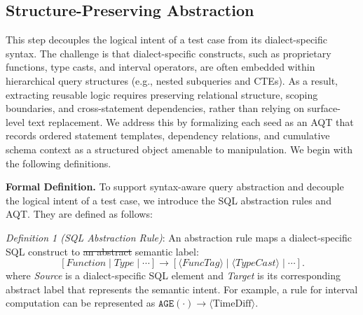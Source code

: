 \documentclass[conference]{IEEEtran}
\makeatletter
\providecommand{\DIFaddtex}[1]{{\protect\color{blue}\uwave{#1}}} %
\providecommand{\DIFdeltex}[1]{{\protect\color{red}\sout{#1}}} %
\providecommand{\DIFaddbegin}{} %
\providecommand{\DIFaddend}{} %
\providecommand{\DIFdelbegin}{} %
\providecommand{\DIFdelend}{} %
\providecommand{\DIFadd}[1]{\texorpdfstring{\DIFaddtex{#1}}{#1}} %
\providecommand{\DIFdel}[1]{\texorpdfstring{\DIFdeltex{#1}}{}} %
\providecommand{\DIFscaledelfig}{0.5}
\newlength{\DIFdelgraphicswidth} %
\newlength{\DIFdelgraphicsheight} %
\providecommand{\DIFaddincludegraphics}[2][]{{\color{blue}\fbox{\DIFOincludegraphics[#1]{#2}}}} %
\providecommand{\DIFdelincludegraphics}[2][]{%
\sbox{\DIFdelgraphicsbox}{\DIFOincludegraphics[#1]{#2}}%
\settoboxwidth{\DIFdelgraphicswidth}{\DIFdelgraphicsbox} %
\settoboxtotalheight{\DIFdelgraphicsheight}{\DIFdelgraphicsbox} %
\scalebox{\DIFscaledelfig}{%
\parbox[b]{\DIFdelgraphicswidth}{\usebox{\DIFdelgraphicsbox}\\[-\baselineskip] \rule{\DIFdelgraphicswidth}{0em}}\llap{\resizebox{\DIFdelgraphicswidth}{\DIFdelgraphicsheight}{%
\setlength{\unitlength}{\DIFdelgraphicswidth}%
\begin{picture}(1,1)%
\thicklines\linethickness{2pt} %
{\color[rgb]{1,0,0}\put(0,0){\framebox(1,1){}}}%
{\color[rgb]{1,0,0}\put(0,0){\line( 1,1){1}}}%
{\color[rgb]{1,0,0}\put(0,1){\line(1,-1){1}}}%
\end{picture}%
}\hspace*{3pt}}} %
} %
\DeclareRobustCommand{\DIFaddbegin}{\DIFOaddbegin \let\includegraphics\DIFaddincludegraphics} %
\DeclareRobustCommand{\DIFaddend}{\DIFOaddend \let\includegraphics\DIFOincludegraphics} %
\DeclareRobustCommand{\DIFdelbegin}{\DIFOdelbegin \let\includegraphics\DIFdelincludegraphics} %
\DeclareRobustCommand{\DIFdelend}{\DIFOaddend \let\includegraphics\DIFOincludegraphics} %
\let\sout@orig\sout %
\renewcommand{\sout}[1]{\ifmmode\text{\sout@orig{\ensuremath{#1}}}\else\sout@orig{#1}\fi} %
\makeatother
\begin{document}
\subsection{Structure-Preserving Abstraction}
\label{sec:abstraction}
This step decouples the logical intent of a test case from its dialect-specific syntax.
The challenge is that dialect-specific constructs, such as proprietary functions, type casts, and interval operators, are often embedded within hierarchical query structures (e.g., nested subqueries and CTEs).
As a result, extracting reusable logic requires preserving relational structure, scoping boundaries, and cross-statement dependencies, rather than relying on surface-level text replacement.
We address this by formalizing each seed as an AQT that records ordered statement templates, dependency relations, and cumulative schema context as a structured object amenable to manipulation.
We begin with the following definitions.

\textbf{Formal Definition.}
To support syntax-aware query abstraction and decouple the logical intent of a test case, we introduce the SQL abstraction rules and AQT. 
They are defined as follows:

\textit{Definition 1 (SQL Abstraction Rule)}: An abstraction rule maps a dialect-specific SQL construct to \DIFdelbegin \DIFdel{an abstract
}\DIFdelend \DIFaddbegin \DIFadd{a }\DIFaddend semantic label:
\[
    [\textit{Function} \mid \textit{Type} \mid \cdots]
    \rightarrow
    [\langle \textit{FuncTag} \rangle \mid
     \langle \textit{TypeCast} \rangle \mid \cdots].
\]
where \textit{Source} is a dialect-specific SQL element and \textit{Target} is its corresponding abstract label that represents the semantic intent. For example, a rule for interval computation can be represented as $\texttt{AGE}(\cdot) \rightarrow \langle \text{TimeDiff} \rangle$.
\end{document}
